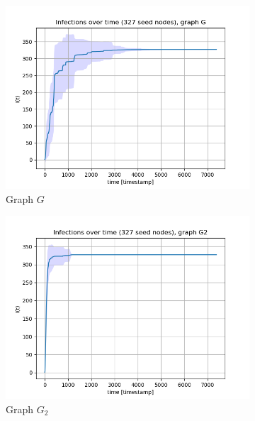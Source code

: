 \documentclass[letterpaper]{article}
\begin{document}
\begin{figure}
    \centering
    \begin{subfigure}[b]{0.32\textwidth}
        \includegraphics[width=\textwidth]{img/infections_G.png}
        \caption{Graph \(G\)}
	    \label{fig:infections_over_time_G}
    \end{subfigure}
    \begin{subfigure}[b]{0.32\textwidth}
        \includegraphics[width=\textwidth]{img/infections_G2.png}
        \caption{Graph \(G_2\)}
	    \label{fig:infections_over_time_G2}
    \end{subfigure}
    \begin{subfigure}[b]{0.32\textwidth}

\end{subfigure}
\end{figure}
\end{document}
